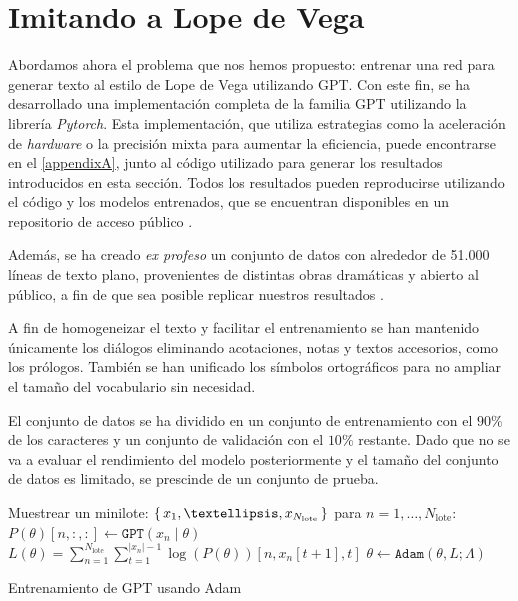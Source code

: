 \chapter{Imitando a Lope de Vega} \label{chapter6}
Abordamos ahora el problema que nos hemos propuesto: entrenar una red para generar texto al estilo de Lope de Vega utilizando GPT. Con este fin, se ha desarrollado una implementación completa de la familia GPT utilizando la librería \textit{Pytorch}. Esta implementación, que utiliza estrategias como la aceleración de \textit{hardware} o la precisión mixta para aumentar la eficiencia, puede encontrarse en el \cref{appendixA}, junto al código utilizado para generar los resultados introducidos en esta sección. Todos los resultados pueden reproducirse utilizando el código y los modelos entrenados, que se encuentran disponibles en un repositorio de acceso público \cite{githubrepo}.

Además, se ha creado \textit{ex profeso} un conjunto de datos con alrededor de 51.000 líneas de texto plano, provenientes de distintas obras dramáticas y abierto al público, a fin de que sea posible replicar nuestros resultados \cite{lopedataset}.

A fin de homogeneizar el texto y facilitar el entrenamiento se han mantenido únicamente los diálogos eliminando acotaciones, notas y textos accesorios, como los prólogos. También se han unificado los símbolos ortográficos para no ampliar el tamaño del vocabulario sin necesidad.

El conjunto de datos se ha dividido en un conjunto de entrenamiento con el \( 90\% \) de los caracteres y un conjunto de validación con el \( 10\% \) restante. Dado que no se va a evaluar el rendimiento del modelo posteriormente y el tamaño del conjunto de datos es limitado, se prescinde de un conjunto de prueba.

\begin{algorithm}[tb]
  \SetAlgoLined

   {
    Muestrear un minilote: $\Set{x_{1}, …, x_{N_\text{lote}}}$ \;
    para $n = 1, …, N_\text{lote}$: $P(\theta)[n, :, :] \gets \texttt{GPT}(x_n \mid \theta)$ \;
    $L(\theta) = \sum_{n = 1}^{N_\text{lote}} \sum_{t = 1}^{|x_n| - 1} \log(P(\theta))[n, x_n[t + 1], t]$ \;
    $\theta \gets \texttt{Adam}(\theta, L; \Lambda)$ \;
  }
  \Return{$\theta$}

  \caption{Entrenamiento de GPT usando Adam \cite{phuong2022formal}}
  \label{algo:gpt_train}
\end{algorithm}

